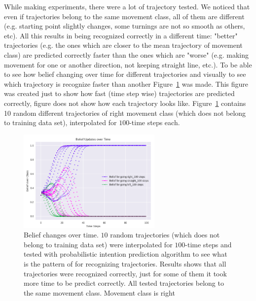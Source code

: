 

While making experiments, there were a lot of trajectory tested. We noticed that even if trajectories belong to the same movement class, all of them are different (e.g. starting point slightly changes, some turnings are not so smooth as others, etc). All this results in being recognized correctly in a different time: "better" trajectories (e.g. the ones which are closer to the mean trajectory of movement class) are predicted correctly faster than the ones which are "worse" (e.g. making movement for one or another direction, not keeping straight line, etc.). To be able to see how belief changing over time for different trajectories and visually to see which trajectory is recognize faster than another Figure~\ref{fig:10Rights} was made. This figure was created just to show how fast (time step wise) trajectories are predicted correctly, figure does not show how each trajectory looks like. Figure~\ref{fig:10Rights} contains 10 random different trajectories of right movement class (which does not belong to training data set), interpolated for $100$-time steps each.

\begin{figure}[H]
	\centering  	
	\includegraphics[width=7cm]{img/10right.png}
	\caption{Belief changes over time. $10$ random trajectories (which does not belong to training data set) were interpolated for $100$-time steps and tested with probabilistic intention prediction algorithm to see what is the pattern of for recognizing trajectories. Results shows that all trajectories were recognized correctly, just for some of them it took more time to be predict correctly. All tested trajectories belong to the same movement class. Movement class is right}
	\label{fig:10Rights}    
\end{figure}

